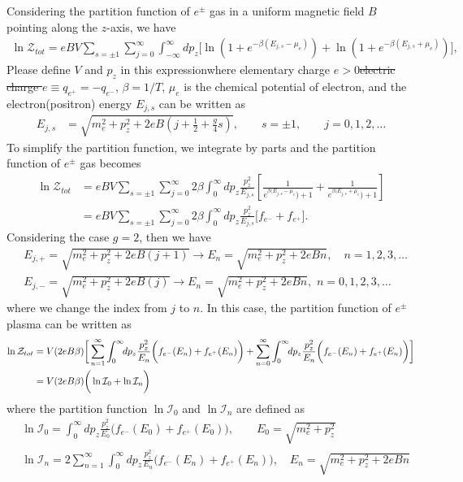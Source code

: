 \documentclass[sn-mathphys,Numbered]{sn-jnl}
\newcommand{\rev}[1]{{\color{blue}#1}}
\begin{document}
Considering the partition function of $e^\pm$ gas in a uniform magnetic field $B$ pointing along the $z$-axis, we have
\begin{align}
\ln\mathcal{Z}_{tot}=eBV\!\!\sum_{s=\pm1}\sum_{j=0}^\infty\int^\infty_{-\infty} \!\!dp_z\bigg[\ln\left(1+e^{-\beta(E_{j,s}-\mu_e)}\right)+\ln\left(1+e^{-\beta(E_{j,s}+\mu_e)}\right)\bigg],
\end{align}
\rev{Please define $V$ and $p_z$ in this expression}where \rev{elementary charge $e>0$}\sout{electric charge $e\equiv q_{e^{+}}=-q_{e^{-}}$}, $\beta=1/T$, $\mu_e$ is the chemical potential of electron, and the electron(positron) energy $E_{j,s}$ can be written as
\begin{align}
E_{j,s}&=\sqrt{m^2_e+p^2_z+2eB\left(j+\frac{1}{2}+\frac{g}{4}s\right)},\qquad s=\pm1,\qquad j=0,1,2,\dots
\end{align}
To simplify the partition function, we integrate by parts and the partition function of $e^\pm$ gas becomes
\begin{align}
\ln\mathcal{Z}_{tot}&=eBV\sum_{s=\pm1}\sum_{j=0}^\infty2\beta\int_0^\infty\!\!dp_z \frac{p_z^2}{E_{j,s}}\left[\frac{1}{e^{\beta(E_{j,s}-\mu_e})+1}+\frac{1}{e^{\beta(E_{j,s}+\mu_e})+1}\right]\\
&=eBV\sum_{s=\pm1}\sum_{j=0}^\infty2\beta\int_0^\infty\!\!dp_z \frac{p_z^2}{E_{j,s}}\bigg[f_{e^-}+f_{e^+}\bigg].
\end{align}
Considering the case $g=2$, then we have
\begin{align}
&E_{j,+}=\sqrt{{m}_e^2+p^2_z+2eB\left(j+1\right)}\longrightarrow E_{n}=\sqrt{{m}_e^2+p^2_z+2eBn},\quad n=1,2,3,\dots\\
&E_{j,-}=\sqrt{{m}_e^2+p^2_z+2eB\left(j\right)}\longrightarrow E_{n}=\sqrt{{m}_e^2+p^2_z+2eBn},\,\, n=0,1,2,3,\dots
\end{align}
where we change the index from $j$ to $n$. In this case, the partition function of $e^\pm$ plasma can be written as
\begin{align}
\ln\mathcal{Z}_{tot}&=V(2eB\beta) \bigg[ \sum_{n=1}^\infty\int_0^\infty\!\!dp_z \frac{p_z^2}{E_{n}}\bigg(f_{e^-}(E_n)+f_{e^+}(E_n)\bigg)+\sum_{n=0}^\infty\int_0^\infty\!\!dp_z \frac{p_z^2}{E_{n}}\bigg(f_{e^-}(E_n)+f_{e^+}(E_n)\bigg)\bigg]\notag\\
&=V(2eB\beta)\bigg(\ln\mathcal{I}_{0}+\ln\mathcal{I}_{n}\bigg)
\end{align}
where the partition function $\ln\mathcal{I}_{0}$ and $\ln\mathcal{I}_{n}$ are defined as
\begin{align}
&\ln\mathcal{I}_{0}=\int_0^\infty\!\!dp_z \frac{p_z^2}{E_0}\bigg(f_{e^-}(E_0)+f_{e^+}(E_0)\bigg),\qquad E_0=\sqrt{{m}_e^2+p^2_z} \\
&\ln\mathcal{I}_{n}=2 \sum_{n=1}^\infty\int_0^\infty\!\!dp_z \frac{p_z^2}{E_{n}}\bigg(f_{e^-}(E_n)+f_{e^+}(E_n)\bigg),\quad E_n=\sqrt{{m}_e^2+p^2_z+2eBn}
\end{align}
\end{document}
